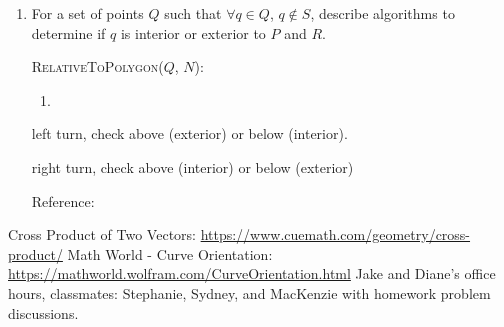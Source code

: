 \documentclass [12pt]{article}
\begin{document}
\begin{enumerate}[label=(\alph*)]
        \pagebreak
        
        \item For a set of points $Q$ such that $\forall q \in Q$, $q \notin S$, describe algorithms to determine if $q$ is interior or exterior to $P$ and $R$.
        
            \cbstart
            \textsc{RelativeToPolygon($Q$, $N$)}:
            \begin{enumerate}[label=\arabic*.]
                \item 
            \end{enumerate}
        \cbend


        left turn, check above (exterior) or below (interior). 

        right turn, check above (interior) or below (exterior)


        Reference: \cite{officehours}

    \end{enumerate}


    \pagebreak



\begin{thebibliography}{1}
Cross Product of Two Vectors: \url{https://www.cuemath.com/geometry/cross-product/}
Math World - Curve Orientation: \url{https://mathworld.wolfram.com/CurveOrientation.html}
Jake and Diane's office hours, classmates: Stephanie, Sydney, and MacKenzie with homework problem discussions.
\end{thebibliography}
\end{document}
